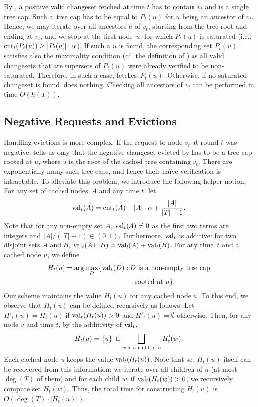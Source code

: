 By , a positive valid changeset
fetched at time $t$ has to contain $v_t$ and is a single tree cap. Such a~tree
cap has to be equal to $P_t(u)$ for $u$ being an ancestor of $v_t$. 
Hence, we may iterate over all
ancestors $u$ of $v_t$, starting from the tree root and ending at $v_t$, and
we stop at the first node~$u$, for which $P_t(u)$ is saturated (i.e.,
$\textrm{cnt}_t(P_t(u)) \geq |P_t(u)| \cdot \alpha$). If such a $u$ is found, the
corresponding set $P_t(u)$ satisfies also the maximality condition (cf.~the
definition of \ALGTC) as all valid changesets that are supersets of $P_t(u)$
were already verified to be non-saturated. Therefore, in such a case, \ALGTC
fetches~$P_t(u)$. Otherwise, if no saturated changeset is found, \ALGTC does
nothing. Checking all ancestors of $v_t$ can be performed in time $O(h(T))$.

\subsection{Negative Requests and Evictions}
\label{sec:implementing_negative_counters}

Handling evictions is more complex. If the request to
node $v_t$ at round $t$ was negative,
 tells us only that the negative 
changeset evicted by \ALGTC has to be a tree cap rooted at $u$, where $u$ is the
root of the cached tree containing $v_t$. There are exponentially many such
tree caps, and hence their naïve verification is intractable. To alleviate
this problem, we introduce the following helper notion. For any set of cached
nodes~$A$ and any time $t$, let
\[
  \textrm{val}_t(A) = \textrm{cnt}_t(A) - |A| \cdot \alpha + \frac{|A|}{|T|+1}.
\]
Note that for any non-empty set $A$, $\textrm{val}_t(A) \neq 0$ as the first two terms
are integers and $|A|/(|T|+1) \in (0,1)$. Furthermore, $\textrm{val}_t$ is additive:
for two disjoint sets $A$ and $B$, $\textrm{val}_t(A \sqcup B) =
\textrm{val}_t(A) + \textrm{val}_t(B)$. For any time~$t$ and a cached node $u$, we define
\begin{align*}
  H_t(u) = \arg \max_D \{ \textrm{val}_t(D) : &\; \textnormal{$D$ is a non-empty tree cap} \\
    & \quad \textnormal{rooted at $u$} \}.
\end{align*}
Our scheme maintains the value $H_t(u)$ for any cached node $u$. To this end,
we observe that $H_t(u)$ can be defined recursively as follows. Let
$H'_t(u) = H_t(u)$ if $\textrm{val}_t(H_t(u)) > 0$ and $H'_t(u) = \emptyset$ otherwise.
Then, for any node $v$ and time $t$, by the additivity of $\textrm{val}_t$, 
\begin{equation*}
\label{eq:h_t_recurrence}
  H_t(u) = \{ u \} \; \sqcup \bigsqcup_\textnormal{$w$ is a child of $u$} H'_t(w).
\end{equation*}
Each cached node $u$ keeps the value $\textrm{val}_t(H_t(u))$. Note that set $H_t(u)$
itself can be recovered from this information: we iterate over all children of
$u$ (at most $\deg(T)$ of them) and for each child $w$, if $\textrm{val}_t(H_t(w)) >
0$, we recursively compute set $H_t(w)$. Thus, the total time for constructing
$H_t(u)$ is $O(\deg(T) \cdot |H_t(u)|)$.

